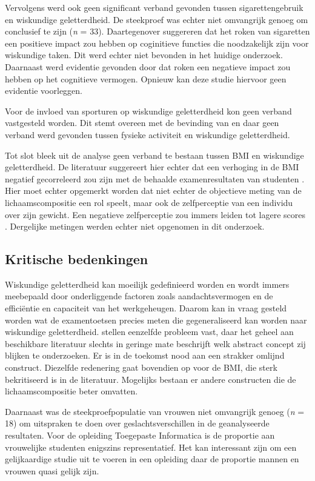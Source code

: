 \documentclass{hogent-article}
\begin{document}
Vervolgens werd ook geen significant verband gevonden tussen sigarettengebruik en wiskundige geletterdheid. De steekproef was echter niet omvangrijk genoeg om conclusief te zijn (\textit{n} = 33). Daartegenover suggereren \textcite{Kumari2003} dat het roken van sigaretten een positieve impact zou hebben op coginitieve functies die noodzakelijk zijn voor wiskundige taken. Dit werd echter niet bevonden in het huidige onderzoek. Daarnaast werd evidentie gevonden door \textcite{Kalmijn2002} dat roken een negatieve impact zou hebben op het cognitieve vermogen. Opnieuw kan deze studie hiervoor geen evidentie voorleggen.

Voor de invloed van sporturen op wiskundige geletterdheid kon geen verband vastgesteld worden. Dit stemt overeen met de bevinding van \textcite{Dielens2013} en \textcite{Yarkwah2020} daar geen verband werd gevonden tussen fysieke activiteit en wiskundige geletterdheid.

Tot slot bleek uit de analyse geen verband te bestaan tussen BMI en wiskundige geletterdheid. De literatuur suggereert hier echter dat een verhoging in de BMI negatief gecorreleerd zou zijn met de behaalde examenresultaten van studenten \autocite{Dielens2013}. Hier moet echter opgemerkt worden dat niet echter de objectieve meting van de lichaamscompositie een rol speelt, maar ook de zelfperceptie van een individu over zijn gewicht. Een negatieve zelfperceptie zou immers leiden tot lagere scores \autocite{Florin2011}. Dergelijke metingen werden echter niet opgenomen in dit onderzoek.

\subsection{Kritische bedenkingen}
Wiskundige geletterdheid kan moeilijk gedefinieerd worden en wordt immers meebepaald door onderliggende factoren zoals aandachtsvermogen en de efficiëntie en capaciteit van het werkgeheugen. Daarom kan in vraag gesteld worden wat de examentoetsen precies meten die gegeneraliseerd kan worden naar wiskundige geletterdheid. \textcite{Howie2012} stellen eenzelfde probleem vast, daar het geheel aan beschikbare literatuur slechts in geringe mate beschrijft welk abstract concept zij blijken te onderzoeken. Er is in de toekomst nood aan een strakker omlijnd construct. Diezelfde redenering gaat bovendien op voor de BMI, die sterk bekritiseerd is in de literatuur. Mogelijks bestaan er andere constructen die de lichaamscompositie beter omvatten.

Daarnaast was de steekproefpopulatie van vrouwen niet omvangrijk genoeg (\textit{n} = 18) om uitspraken te doen over geslachtsverschillen in de geanalyseerde resultaten. Voor de opleiding Toegepaste Informatica is de proportie aan vrouwelijke studenten enigszins representatief. Het kan interessant zijn om een gelijkaardige studie uit te voeren in een opleiding daar de proportie mannen en vrouwen quasi gelijk zijn.
\end{document}
